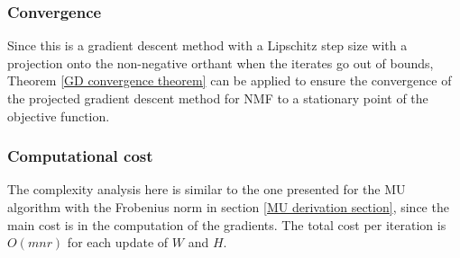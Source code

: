 \subsubsection{Convergence}
Since this is a gradient descent method with a Lipschitz step size with a projection onto the non-negative orthant when the iterates go out of bounds,
Theorem \ref{GD convergence theorem} can be applied to ensure the convergence of the projected gradient descent method for NMF to a stationary point of the objective function.
\subsubsection{Computational cost}
The complexity analysis here is similar to the one presented for the MU algorithm with the Frobenius norm in section \ref{MU derivation section}, since the main cost is in the computation of the gradients. The total cost per iteration is $O(mnr)$ for each update of $W$ and $H$.
